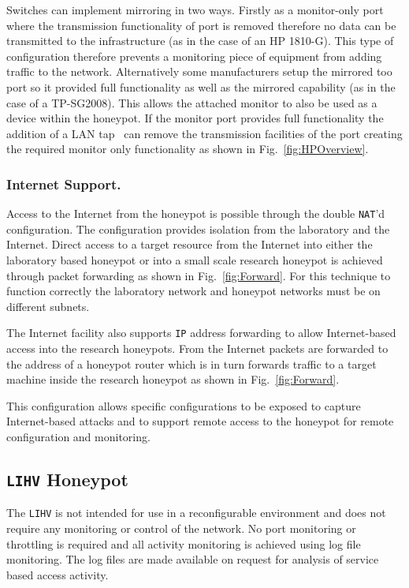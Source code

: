 \documentclass{llncs}
\begin{document}
Switches can implement mirroring in two ways. Firstly as a monitor-only port
where the transmission functionality of port is removed therefore no data can
be transmitted to the infrastructure (as in the case of an HP 1810-G). This
type of configuration therefore prevents a monitoring piece of equipment from
adding traffic to the network. Alternatively some manufacturers setup the
mirrored too port so it provided full functionality as well as the mirrored
capability (as in the case of a TP-SG2008). This allows the attached monitor to
also be used as a device within the honeypot. If the monitor port provides full
functionality the addition of a LAN tap~\cite{RB:13} can remove the
transmission facilities of the port creating the required monitor only
functionality as shown in Fig.~\ref{fig:HPOverview}.

\subsubsection{Internet Support.}

Access to the Internet from the honeypot is possible through the double
\texttt{NAT}'d configuration. The configuration provides isolation from the
laboratory and the Internet. Direct access to a target resource from the
Internet into either the laboratory based honeypot or into a small scale
research honeypot is achieved through packet forwarding as shown in
Fig.~\ref{fig:Forward}. For this technique to function correctly the
laboratory network and honeypot networks must be on different subnets.

The Internet facility also supports \texttt{IP} address forwarding to allow
Internet-based access into the research honeypots. From the Internet packets
are forwarded to the address of a honeypot router which is in turn forwards
traffic to a target machine inside the research honeypot as shown in
Fig.~\ref{fig:Forward}.

This configuration allows specific configurations to be exposed to capture
Internet-based attacks and to support remote access to the honeypot for remote
configuration and monitoring.

\subsection{\texttt{LIHV} Honeypot}

The \texttt{LIHV} is not intended for use in a reconfigurable environment and
does not require any monitoring or control of the network. No port monitoring
or throttling is required and all activity monitoring is achieved using log
file monitoring. The log files are made available on request for analysis of
service based access activity.
\end{document}
